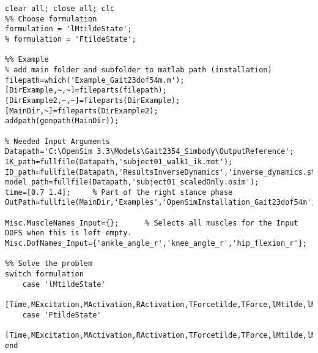 \documentclass[a4paper,oneside,11pt]{article}
\begin{document}
\begin{lstlisting}[frame=none,basicstyle=\tiny]
clear all; close all; clc
%% Choose formulation
formulation = 'lMtildeState';
% formulation = 'FtildeState';

%% Example
% add main folder and subfolder to matlab path (installation)
filepath=which('Example_Gait23dof54m.m'); [DirExample,~,~]=fileparts(filepath); [DirExample2,~,~]=fileparts(DirExample); [MainDir,~]=fileparts(DirExample2);
addpath(genpath(MainDir));

% Needed Input Arguments
Datapath='C:\OpenSim 3.3\Models\Gait2354_Simbody\OutputReference';
IK_path=fullfile(Datapath,'subject01_walk1_ik.mot');
ID_path=fullfile(Datapath,'ResultsInverseDynamics','inverse_dynamics.sto');
model_path=fullfile(Datapath,'subject01_scaledOnly.osim');
time=[0.7 1.4];     % Part of the right stance phase
OutPath=fullfile(MainDir,'Examples','OpenSimInstallation_Gait23dof54m','Results');

Misc.MuscleNames_Input={};      % Selects all muscles for the Input DOFS when this is left empty.
Misc.DofNames_Input={'ankle_angle_r','knee_angle_r','hip_flexion_r'};

%% Solve the problem
switch formulation
    case 'lMtildeState'
        [Time,MExcitation,MActivation,RActivation,TForcetilde,TForce,lMtilde,lM,MuscleNames,OptInfo,DatStore]=SolveMuscleRedundancy_lMtildeState(model_path,IK_path,ID_path,time,OutPath,Misc);
    case 'FtildeState'   
        [Time,MExcitation,MActivation,RActivation,TForcetilde,TForce,lMtilde,lM,MuscleNames,OptInfo,DatStore]=SolveMuscleRedundancy_FtildeState(model_path,IK_path,ID_path,time,OutPath,Misc);
end
\end{lstlisting}
\end{document}
